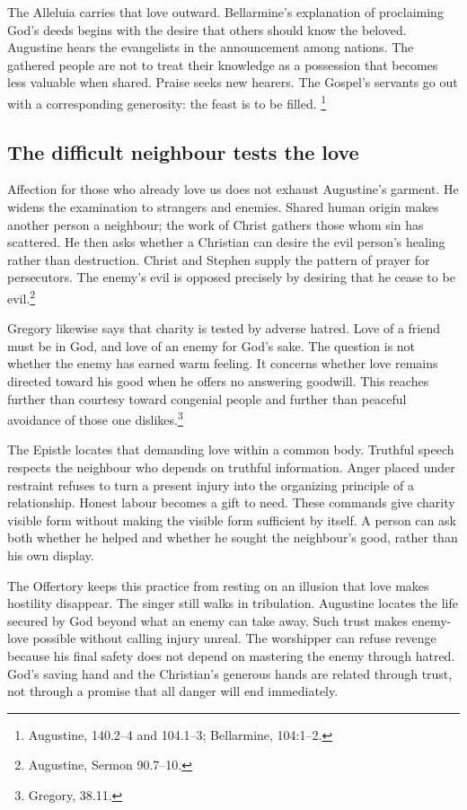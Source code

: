 The Alleluia carries that love outward. Bellarmine's explanation
of proclaiming God's deeds begins with the desire that others
should know the beloved. Augustine hears the evangelists in the
announcement among nations. The gathered people are not to treat
their knowledge as a possession that becomes less valuable when
shared. Praise seeks new hearers. The Gospel's servants go out
with a corresponding generosity: the feast is to be filled.
\footnote{Augustine,  140.2--4 and 104.1--3;
Bellarmine,  104:1--2.}

\subsection{The difficult neighbour tests the love}

Affection for those who already love us does not exhaust Augustine's
garment. He widens the examination to strangers and enemies.
Shared human origin makes another person a neighbour; the work
of Christ gathers those whom sin has scattered. He then asks
whether a Christian can desire the evil person's healing rather
than destruction. Christ and Stephen supply the pattern of prayer
for persecutors. The enemy's evil is opposed precisely by desiring
that he cease to be evil.\footnote{Augustine, Sermon 90.7--10.}

Gregory likewise says that charity is tested by adverse hatred.
Love of a friend must be in God, and love of an enemy for God's
sake. The question is not whether the enemy has earned warm
feeling. It concerns whether love remains directed toward his
good when he offers no answering goodwill. This reaches further
than courtesy toward congenial people and further than peaceful
avoidance of those one dislikes.\footnote{Gregory,  38.11.}

The Epistle locates that demanding love within a common body.
Truthful speech respects the neighbour who depends on truthful
information. Anger placed under restraint refuses to turn a
present injury into the organizing principle of a relationship.
Honest labour becomes a gift to need. These commands give charity
visible form without making the visible form sufficient by itself.
A person can ask both whether he helped and whether he sought
the neighbour's good, rather than his own display.

The Offertory keeps this practice from resting on an illusion
that love makes hostility disappear. The singer still walks in
tribulation. Augustine locates the life secured by God beyond
what an enemy can take away. Such trust makes enemy-love possible
without calling injury unreal. The worshipper can refuse revenge
because his final safety does not depend on mastering the enemy
through hatred. God's saving hand and the Christian's generous
hands are related through trust, not through a promise that all
danger will end immediately.

